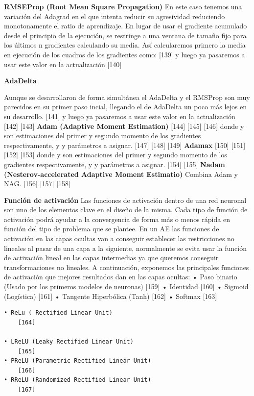 \documentclass[
  a4paper,
  DIV=11,
  numbers=noendperiod]{scrreprt}
\begin{document}
\textbf{RMSEProp (Root Mean Square Propagation)} En este caso tenemos
una variación del Adagrad en el que intenta reducir su agresividad
reduciendo monotonamente el ratio de aprendizaje. En lugar de usar el
gradiente acumulado desde el principio de la ejecución, se restringe a
una ventana de tamaño fijo para los últimos n gradientes calculando su
media. Así calcularemos primero la media en ejecución de los cuadros de
los gradientes como: {[}139{]} y luego ya pasaremos a usar este valor en
la actualización {[}140{]}

\textbf{AdaDelta}

Aunque se desarrollaron de forma simultánea el AdaDelta y el RMSProp son
muy parecidos en su primer paso incial, llegando el de AdaDelta un poco
más lejos en su desarrollo. {[}141{]} y luego ya pasaremos a usar este
valor en la actualización {[}142{]} {[}143{]} \textbf{Adam (Adaptive
Moment Estimation)} {[}144{]} {[}145{]} {[}146{]} donde y son
estimaciones del primer y segundo momento de los gradientes
respectivamente, y y parámetros a asignar. {[}147{]} {[}148{]} {[}149{]}
\textbf{Adamax} {[}150{]} {[}151{]} {[}152{]} {[}153{]} donde y son
estimaciones del primer y segundo momento de los gradientes
respectivamente, y y parámetros a asignar. {[}154{]} {[}155{]}
\textbf{Nadam (Nesterov-accelerated Adaptive Moment Estimatio)} Combina
Adam y NAG. {[}156{]} {[}157{]} {[}158{]}

\textbf{Función de activación} Las funciones de activación dentro de una
red neuronal son uno de los elementos clave en el diseño de la misma.
Cada tipo de función de activación podrá ayudar a la convergencia de
forma más o menos rápida en función del tipo de problema que se plantee.
En un AE las funciones de activación en las capas ocultas van a
conseguir establecer las restricciones no lineales al pasar de una capa
a la siguiente, normalmente se evita usar la función de activación
lineal en las capas intermedias ya que queremos conseguir
transformaciones no lineales. A continuación, exponemos las principales
funciones de activación que mejores resultados dan en las capas ocultas:
• Paso binario (Usado por los primeros modelos de neuronas) {[}159{]} •
Identidad {[}160{]} • Sigmoid (Logística) {[}161{]} • Tangente
Hiperbólica (Tanh) {[}162{]} • Softmax {[}163{]}

\begin{verbatim}
• ReLu ( Rectified Linear Unit)
    [164]

• LReLU (Leaky Rectified Linear Unit)
    [165]
• PReLU (Parametric Rectified Linear Unit)
    [166]
• RReLU (Randomized Rectified Linear Unit)
    [167]
\end{verbatim}
\end{document}
